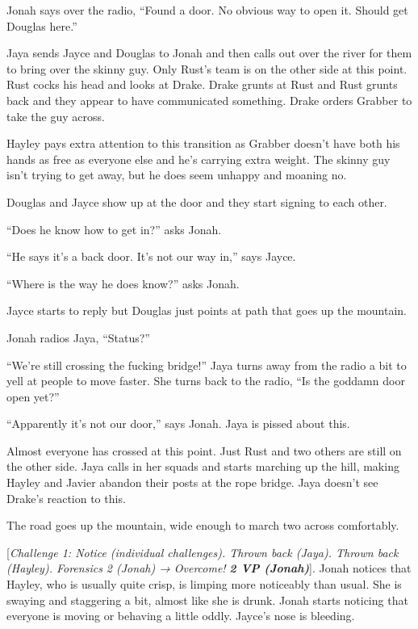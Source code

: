 Jonah says over the radio, ``Found a door.  No obvious way to open it.  Should get Douglas here.''

Jaya sends Jayce and Douglas to Jonah and then calls out over the river for them to bring over the skinny guy.  Only Rust's team is on the other side at this point.  Rust cocks his head and looks at Drake.  Drake grunts at Rust and Rust grunts back and they appear to have communicated something.  Drake orders Grabber to take the guy across.

Hayley pays extra attention to this transition as Grabber doesn't have both his hands as free as everyone else and he's carrying extra weight.  The skinny guy isn't trying to get away, but he does seem unhappy and moaning no.

Douglas and Jayce show up at the door and they start signing to each other.  

``Does he know how to get in?'' asks Jonah.

``He says it's a back door.  It's not our way in,'' says Jayce.

``Where is the way he does know?'' asks Jonah.

Jayce starts to reply but Douglas just points at path that goes up the mountain.

Jonah radios Jaya, ``Status?''

``We're still crossing the fucking bridge!''  Jaya turns away from the radio a bit to yell at people to move faster.  She turns back to the radio, ``Is the goddamn door open yet?''

``Apparently it's not our door,'' says Jonah.  Jaya is pissed about this.

Almost everyone has crossed at this point.  Just Rust and two others are still on the other side.  Jaya calls in her squads and starts marching up the hill, making Hayley and Javier abandon their posts at the rope bridge.  Jaya doesn't see Drake's reaction to this.





The road goes up the mountain, wide enough to march two across comfortably. 

{[}\textit{Challenge 1: Notice (individual challenges).  Thrown back (Jaya).  Thrown back (Hayley).  Forensics 2 (Jonah) → Overcome! }\textit{\textbf{2 VP (Jonah)}}{]}.  Jonah notices that Hayley, who is usually quite crisp, is limping more noticeably than usual.  She is swaying and staggering a bit, almost like she is drunk.  Jonah starts noticing that everyone is moving or behaving a little oddly.  Jayce's nose is bleeding.

